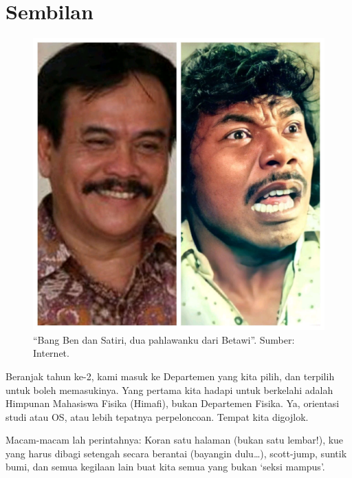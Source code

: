 
\chapter{Sembilan}

\begin{figure}[htbp]
\centerline{\includegraphics[scale=1.0]{01-09-01}}
\caption{“Bang Ben dan Satiri, dua pahlawanku dari Betawi”. Sumber: Internet.}
\label{01-09-01}
\end{figure}
%

Beranjak tahun ke-2, kami masuk ke Departemen yang kita pilih, dan terpilih untuk boleh memasukinya. Yang pertama kita hadapi untuk berkelahi adalah Himpunan Mahasiswa Fisika (Himafi), bukan Departemen Fisika. Ya, orientasi studi atau OS, atau lebih tepatnya perpeloncoan. Tempat kita digojlok.

Macam-macam lah perintahnya: Koran satu halaman (bukan satu lembar!), kue yang harus dibagi setengah secara berantai (bayangin dulu…), scott-jump, suntik bumi, dan semua kegilaan lain buat kita semua yang bukan ‘seksi mampus’.

